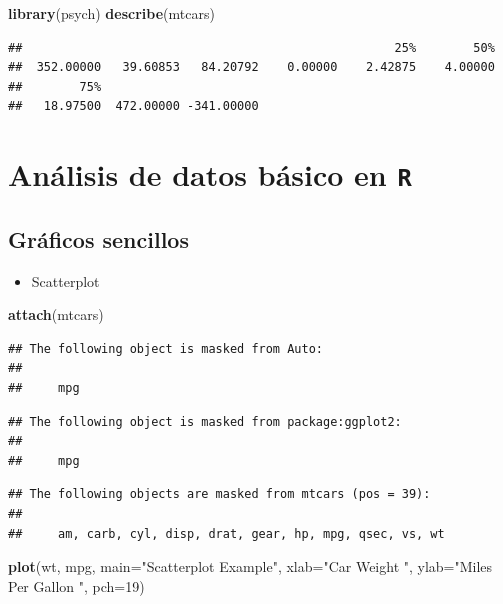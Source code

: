 \documentclass[]{book}
\newenvironment{Shaded}{\begin{snugshade}}{\end{snugshade}}
\newcommand{\KeywordTok}[1]{\textcolor[rgb]{0.13,0.29,0.53}{\textbf{#1}}}
\newcommand{\DataTypeTok}[1]{\textcolor[rgb]{0.13,0.29,0.53}{#1}}
\newcommand{\DecValTok}[1]{\textcolor[rgb]{0.00,0.00,0.81}{#1}}
\newcommand{\StringTok}[1]{\textcolor[rgb]{0.31,0.60,0.02}{#1}}
\newcommand{\NormalTok}[1]{#1}
\providecommand{\tightlist}{%
  \setlength{\itemsep}{0pt}\setlength{\parskip}{0pt}}
\begin{document}
\begin{Shaded}
\begin{Highlighting}[]
\KeywordTok{library}\NormalTok{(psych)}
\KeywordTok{describe}\NormalTok{(mtcars)}
\end{Highlighting}
\end{Shaded}

\begin{verbatim}
##                                                    25%        50% 
##  352.00000   39.60853   84.20792    0.00000    2.42875    4.00000 
##        75%                       
##   18.97500  472.00000 -341.00000
\end{verbatim}

\chapter{\texorpdfstring{Análisis de datos básico en
\texttt{R}}{Análisis de datos básico en R}}\label{basic}

\section{Gráficos sencillos}\label{gruxe1ficos-sencillos}

\begin{itemize}
\tightlist
\item
  Scatterplot
\end{itemize}

\begin{Shaded}
\begin{Highlighting}[]
\KeywordTok{attach}\NormalTok{(mtcars)}
\end{Highlighting}
\end{Shaded}

\begin{verbatim}
## The following object is masked from Auto:
## 
##     mpg
\end{verbatim}

\begin{verbatim}
## The following object is masked from package:ggplot2:
## 
##     mpg
\end{verbatim}

\begin{verbatim}
## The following objects are masked from mtcars (pos = 39):
## 
##     am, carb, cyl, disp, drat, gear, hp, mpg, qsec, vs, wt
\end{verbatim}

\begin{Shaded}
\begin{Highlighting}[]
\KeywordTok{plot}\NormalTok{(wt, mpg, }\DataTypeTok{main=}\StringTok{"Scatterplot Example"}\NormalTok{,}
   \DataTypeTok{xlab=}\StringTok{"Car Weight "}\NormalTok{, }\DataTypeTok{ylab=}\StringTok{"Miles Per Gallon "}\NormalTok{, }\DataTypeTok{pch=}\DecValTok{19}\NormalTok{) }
\end{Highlighting}
\end{Shaded}
\end{document}
